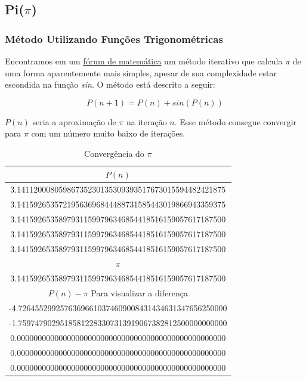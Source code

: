 \documentclass[a4paper]{article}
\begin{document}
\subsection{Pi($\pi$)}

\subsubsection{Método Utilizando Funções Trigonométricas}

Encontramos em um
\href{http://mathforum.org/library/drmath/view/65244.html}{fórum de matemática}
um método iterativo que calcula $ \pi $ de uma forma aparentemente mais
simples, apesar de sua complexidade estar escondida na função \emph{sin}. O
método está descrito a seguir:

\begin{equation}
\label{magic_equation}
P(n+1) = P(n) + sin(P(n))
\end{equation}

$P(n)$ seria a aproximação de $\pi$ na iteração $n$. Esse método consegue
convergir para $\pi$ com um número muito baixo de iterações.

\begin{table}[H]
	\centering
	\begin{tabular}{|c|}
    	\hline
		$P(n)$ \\
		\hline
		3.14112000805986735230135309393517673015594482421875 \\
		\hline
		3.14159265357219563696844488731585443019866943359375 \\
		\hline
		3.14159265358979311599796346854418516159057617187500 \\
		\hline
		3.14159265358979311599796346854418516159057617187500 \\
		\hline
		3.14159265358979311599796346854418516159057617187500 \\
		\hline
		\hline
		$\pi$ \\
		\hline
		3.14159265358979311599796346854418516159057617187500 \\
		\hline
		\hline
		$P(n) - \pi$  Para visualizar a diferença \\
		\hline
		-4.72645529925763696610374609008431434631347656250000 \\
		\hline
		-1.75974790295185812283307313919067382812500000000000 \\
		\hline
		0.00000000000000000000000000000000000000000000000000 \\
		\hline
		0.00000000000000000000000000000000000000000000000000 \\
		\hline
		0.00000000000000000000000000000000000000000000000000 \\
		\hline
	\end{tabular}
	\label{pi_magic}
	\caption{Convergência do $\pi$}
\end{table}
\end{document}
